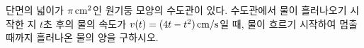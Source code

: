 단면의 넓이가 $\pi\mkern3mu \mathrm{cm}^2$인 원기둥 모양의 수도관이 있다. 수도관에서 물이 흘러나오기 시작한 지 $t$초 후의 물의 속도가 $v(t)=(4t-t^2)\mkern3mu \mathrm{cm/s}$일 때, 물이 흐르기 시작하여 멈출 때까지 흘러나온 물의 양을 구하시오.
